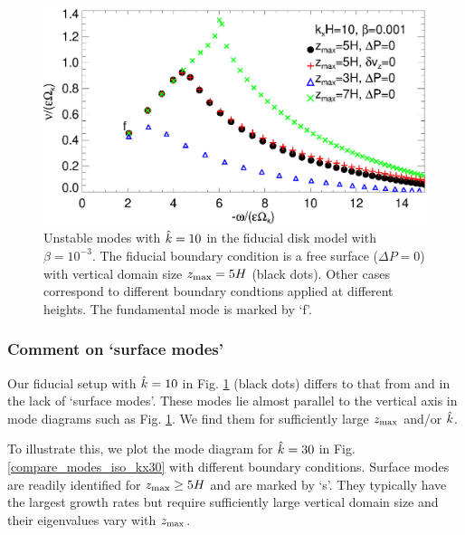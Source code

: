 \begin{figure}
  \includegraphics[width=\linewidth]{figures/compare_modes_iso_kx10.ps}
  \caption{Unstable modes with $\hat{k}=10$ in the fiducial disk model
    with $\beta=10^{-3}$. %
    The fiducial boundary condition is a free surface ($\Delta P=0$)
    with vertical domain size $z_\mathrm{max}=5H$  (black dots).  Other
    cases correspond to different boundary condtions applied at
    different heights. The fundamental mode is marked by `f'.   
    \label{compare_modes_iso_kx10} 
  }
\end{figure}

\subsubsection{Comment on `surface modes'}\label{surf_comment}
Our fiducial setup with $\hat{k}=10$ in 
Fig. \ref{compare_modes_iso_kx10} (black dots) differs to that from
\cite{nelson13} and \cite{mcnally14} in the lack of `surface modes'. 
These modes lie almost parallel to the vertical axis in mode 
diagrams such as Fig. \ref{compare_modes_iso_kx10}. We find them for 
sufficiently large $z_\mathrm{max}$ and/or $\hat{k}$. %

To illustrate this, we plot the mode diagram for $\hat{k}=30$ in  
Fig. \ref{compare_modes_iso_kx30} with different boundary 
conditions. Surface modes are readily identified for 
$z_\mathrm{max}\geq 5H$ and are marked by `s'. They typically
have the largest growth rates but require sufficiently large vertical
domain size and their eigenvalues vary with $z_\mathrm{max}$.  

